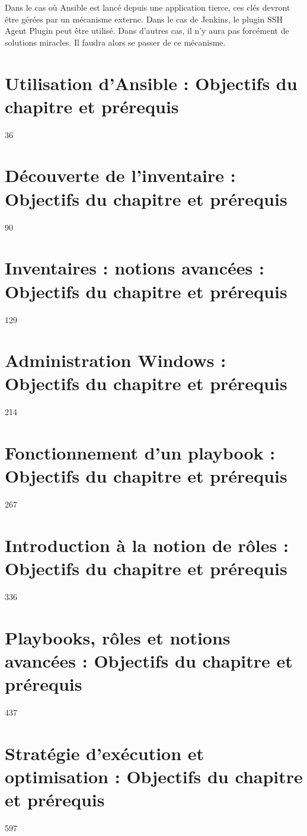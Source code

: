 \documentclass[hidelinks]{article}
\begin{document}
Dans le cas où Ansible est lancé depuis une application tierce, ces clés devront être gérées par un mécanisme externe. Dans le cas de Jenkins, le plugin SSH Agent Plugin peut être utilisé. Dans d'autres cas, il n'y aura pas forcément de solutions miracles. Il faudra alors se passer de ce mécanisme.


\section{Utilisation d'Ansible : Objectifs du chapitre et prérequis}
\label{sec:Utilisation d'Ansible}
36

\section{Découverte de l'inventaire : Objectifs du chapitre et prérequis}
\label{sec:Découverte de l'inventaire}
90

\section{Inventaires : notions avancées : Objectifs du chapitre et prérequis}
\label{sec:Inventaires-notions avancées}
129

\section{Administration Windows : Objectifs du chapitre et prérequis}
\label{sec:Administration Windows}
214

\section{Fonctionnement d'un playbook : Objectifs du chapitre et prérequis}
\label{sec:Fonctionnement d'un playbook}
267

\section{Introduction à la notion de rôles : Objectifs du chapitre et prérequis}
\label{sec:Introduction à la notion de rôles}
336

\section{Playbooks, rôles et notions avancées : Objectifs du chapitre et prérequis}
\label{sec:Playbooks, rôles et notions avancées}
437

\section{Stratégie d'exécution et optimisation : Objectifs du chapitre et prérequis}
\label{sec:Stratégie d'exécution et optimisation}
597
\end{document}
